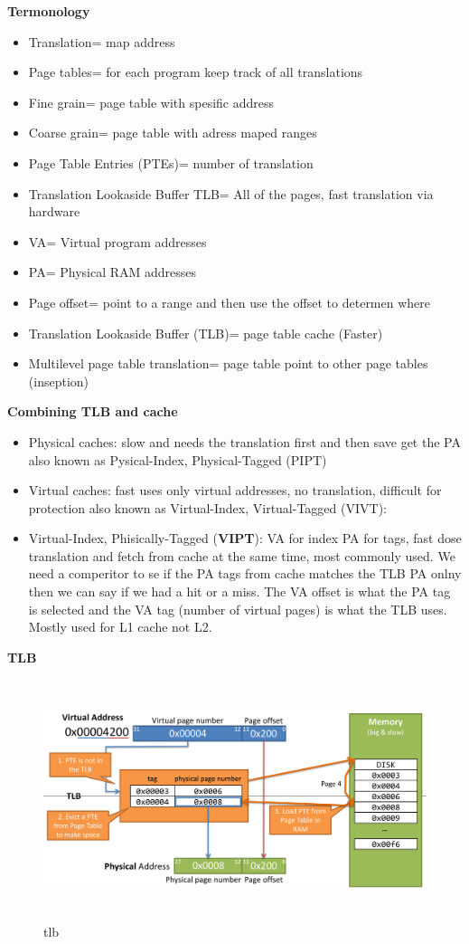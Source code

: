 \textbf{Termonology}
\begin{itemize}
\item  Translation= map address
\item  Page tables= for each program keep track of all translations
\item  Fine grain= page table with spesific address
\item  Coarse grain= page table with adress maped ranges
\item  Page Table Entries (PTEs)= number of translation  
\item  Translation Lookaside Buffer TLB= All of the pages, fast translation via hardware
\item  VA= Virtual program addresses
\item  PA= Physical RAM addresses
\item  Page offset= point to a range and then use the offset to determen where
\item  Translation Lookaside Buffer (TLB)= page table cache (Faster)
\item  Multilevel page table translation= page table point to other page tables (inseption)
\end{itemize}

\newpage

\textbf{Combining TLB and cache}
\begin{itemize}
\item  Physical caches: slow and needs the translation first and then save get the PA
  also known as Pysical-Index, Physical-Tagged (PIPT)
\item  Virtual caches: fast uses only virtual addresses, no translation, difficult for protection
  also known as Virtual-Index, Virtual-Tagged (VIVT):
\item  Virtual-Index, Phisically-Tagged (\textbf{VIPT}): VA for index PA for tags, fast dose translation and
  fetch from cache at the same time, most commonly used.
  We need a comperitor to se if the PA tags from cache matches the TLB PA onlny then we can say if we had a hit or a miss.
  The VA offset is what the PA tag is selected and the VA tag (number of virtual pages) is what the TLB uses.
  Mostly used for L1 cache not L2.
\end{itemize}

\textbf{TLB}
\begin{figure}[h]
    \vspace{10mm}
    \centering
    \includegraphics[width=16cm, height=7cm]{image/tlb.png}
    \caption{tlb}
\end{figure}

